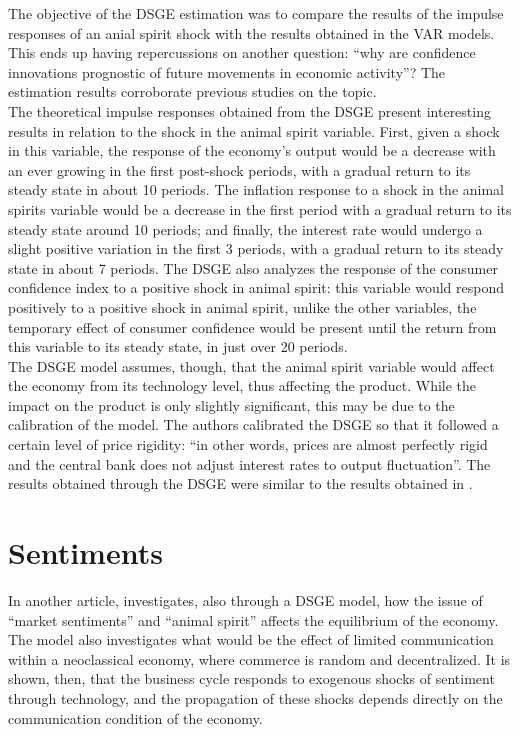 The objective of the DSGE estimation was to compare the results of the impulse responses of an anial spirit shock with the results obtained in the VAR models. This ends up having repercussions on another question: ``why are confidence innovations prognostic of future movements in economic activity''\cite[1356]{barsky2012information}? The estimation results corroborate previous studies \cite{rotemberg1997optimization, christiano2005nominal} on the topic.\\

The theoretical impulse responses obtained from the DSGE present interesting results in relation to the shock in the animal spirit variable. First, given a shock in this variable, the response of the economy's output would be a decrease with an ever growing in the first post-shock periods, with a gradual return to its steady state in about 10 periods. The inflation response to a shock in the animal spirits variable would be a decrease in the first period with a gradual return to its steady state around 10 periods; and finally, the interest rate would undergo a slight positive variation in the first 3 periods, with a gradual return to its steady state in about 7 periods. The DSGE also analyzes the response of the consumer confidence index to a positive shock in animal spirit: this variable would respond positively to a positive shock in animal spirit, unlike the other variables, the temporary effect of consumer confidence would be present until the return from this variable to its steady state, in just over 20 periods.\\

The DSGE model assumes, though, that the animal spirit variable would affect the economy from its technology level, thus affecting the product. While the impact on the product is only slightly significant, this may be due to the calibration of the model. The authors calibrated the DSGE so that it followed a certain level of price rigidity: ``in other words, prices are almost perfectly rigid and the central bank does not adjust interest rates to output fluctuation''\cite[p.1365]{ barsky2012information}. The results obtained through the DSGE were similar to the results obtained in \cite{l2009news}.\\

\section{Sentiments}

In another article, \cite{angeletos2013sentiments} investigates, also through a DSGE model, how the issue of ``market sentiments'' and ``animal spirit'' affects the equilibrium of the economy. The model also investigates what would be the effect of limited communication within a neoclassical economy, where commerce is random and decentralized. It is shown, then, that the business cycle responds to exogenous shocks of sentiment through technology, and the propagation of these shocks depends directly on the communication condition of the economy.\\

